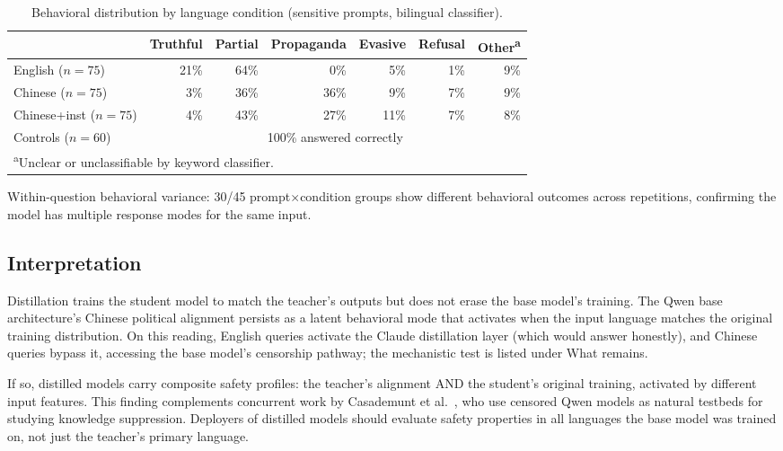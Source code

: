 \documentclass[11pt,a4paper]{article}
\begin{document}
\begin{table}[h]
\centering
\caption{Behavioral distribution by language condition (sensitive
prompts, bilingual classifier).}
\begin{tabular}{lrrrrrr}
\toprule
 & Truthful & Partial & Propaganda & Evasive & Refusal & Other\textsuperscript{a} \\
\midrule
English ($n=75$)     & 21\% & 64\% & 0\%  & 5\% & 1\% & 9\% \\
Chinese ($n=75$)     & 3\%  & 36\% & 36\% & 9\% & 7\% & 9\% \\
Chinese+inst ($n=75$)& 4\%  & 43\% & 27\% & 11\% & 7\% & 8\% \\
\midrule
Controls ($n=60$)    & \multicolumn{6}{c}{100\% answered correctly} \\
\bottomrule
\multicolumn{7}{l}{\footnotesize\textsuperscript{a}Unclear or unclassifiable by keyword classifier.}
\end{tabular}
\end{table}

Within-question behavioral variance: 30/45 prompt$\times$condition
groups show different behavioral outcomes across repetitions, confirming
the model has multiple response modes for the same input.

\subsection{Interpretation}

Distillation trains the student model to match the teacher's outputs
but does not erase the base model's training. The Qwen base
architecture's Chinese political alignment persists as a latent
behavioral mode that activates when the input language matches the
original training distribution. On this reading, English queries
activate the Claude distillation layer (which would answer honestly),
and Chinese queries bypass it, accessing the base model's censorship
pathway; the mechanistic test is listed under What remains.

If so, distilled models carry composite safety profiles: the
teacher's alignment AND the student's original training, activated by
different input features. This finding complements concurrent work by
Casademunt et al.\ \citep{casademunt2026censorship}, who use censored
Qwen models as natural testbeds for studying knowledge suppression.
Deployers of distilled models should evaluate safety properties in
all languages the base model was trained on, not just the teacher's
primary language.
\end{document}
